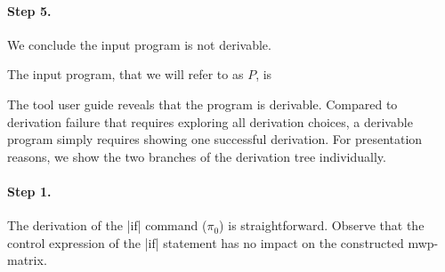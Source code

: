 \begin{example}
\paragraph*{Step 5.} We conclude the input program is not derivable.
\end{example}

\begin{example}\label{ex:while1}
The input program, that we will refer to as \(P\), is

\begin{minipage}{\textwidth}

\end{minipage}

The tool user guide reveals that the program is derivable.
Compared to derivation failure that requires exploring all derivation choices,
a derivable program simply requires showing one successful derivation.
For presentation reasons, we show the two branches of the derivation tree individually.

\paragraph*{Step 1.} The derivation of the \pr|if| command (\(\pi_0\)){ }is straightforward.
Observe that the control expression of the \pr|if| statement has no impact on the constructed mwp-matrix.


\end{example}
